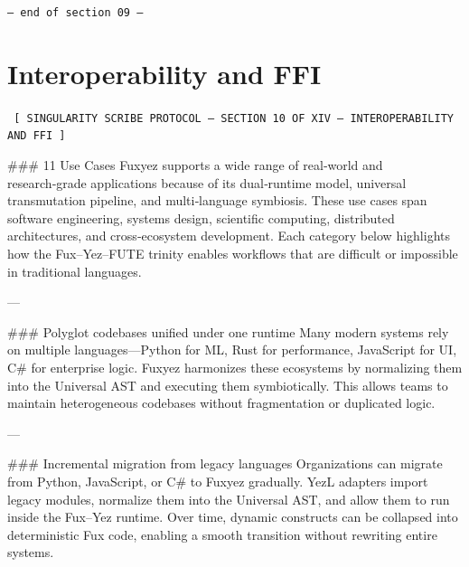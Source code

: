 \begin{enumerate}
    \vspace{1cm}
    \begin{center}
    \color{alienPurple}\texttt{--- end of section 09 ---}
    \end{center}
    \clearpage
    

    \chapter*{Interoperability and FFI}
    
    
    \begin{glyphbox}
    \centering
    \color{neonCyan}\fontsize{8}{10}\selectfont\texttt{
    [ SINGULARITY SCRIBE PROTOCOL -- SECTION 10 OF XIV -- INTEROPERABILITY AND FFI ]
    }
    \end{glyphbox}
    \vspace{0.3cm}
    
    
    \#\#\# 11 Use Cases  
Fuxyez supports a wide range of real‑world and research‑grade applications because of its dual‑runtime model, universal transmutation pipeline, and multi‑language symbiosis. These use cases span software engineering, systems design, scientific computing, distributed architectures, and cross‑ecosystem development. Each category below highlights how the Fux–Yez–FUTE trinity enables workflows that are difficult or impossible in traditional languages.

---

\#\#\# Polyglot codebases unified under one runtime  
Many modern systems rely on multiple languages—Python for ML, Rust for performance, JavaScript for UI, C\# for enterprise logic. Fuxyez harmonizes these ecosystems by normalizing them into the Universal AST and executing them symbiotically. This allows teams to maintain heterogeneous codebases without fragmentation or duplicated logic.

---

\#\#\# Incremental migration from legacy languages  
Organizations can migrate from Python, JavaScript, or C\# to Fuxyez gradually. YezL adapters import legacy modules, normalize them into the Universal AST, and allow them to run inside the Fux–Yez runtime. Over time, dynamic constructs can be collapsed into deterministic Fux code, enabling a smooth transition without rewriting entire systems.


\end{enumerate}
